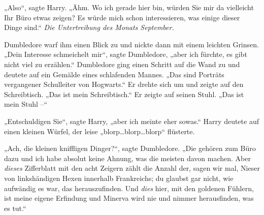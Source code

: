 „Also“, sagte Harry. „Ähm. Wo ich gerade hier bin, würden Sie mir da vielleicht Ihr Büro etwas zeigen? Es würde mich schon interessieren, was einige dieser Dinge sind.“ \emph{Die Untertreibung des Monats September.}

Dumbledore warf ihm einen Blick zu und nickte dann mit einem leichten Grinsen. „Dein Interesse schmeichelt mir“, sagte Dumbledore, „aber ich fürchte, es gibt nicht viel zu erzählen.“ Dumbledore ging einen Schritt auf die Wand zu und deutete auf ein Gemälde eines schlafenden Mannes. „Das sind Porträts vergangener Schulleiter von Hogwarts.“ Er drehte sich um und zeigte auf den Schreibtisch. „Das ist mein Schreibtisch.“ Er zeigte auf seinen Stuhl. „Das ist mein Stuhl –“

„Entschuldigen Sie“, sagte Harry, „aber ich meinte eher sowas.“ Harry deutete auf einen kleinen Würfel, der leise „blorp…blorp…blorp“ flüsterte.

„Ach, die kleinen kniffligen Dinger?“, sagte Dumbledore. „Die gehören zum Büro dazu und ich habe absolut keine Ahnung, was die meisten davon machen. Aber \emph{dieses} Zifferblatt mit den acht Zeigern zählt die Anzahl der, sagen wir mal, Nieser von linkshändigen Hexen innerhalb Frankreichs; du glaubst gar nicht, wie aufwändig es war, das herauszufinden. Und \emph{dies} hier, mit den goldenen Fühlern, ist meine eigene Erfindung und Minerva wird nie und nimmer herausfinden, was es tut.“

